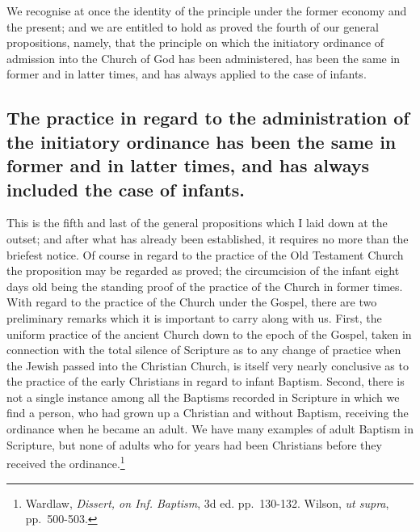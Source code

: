 \documentclass[]{book}
\begin{document}
We recognise at once the identity of the principle under the former economy and the present; and we are entitled to hold as proved the fourth of our general propositions, namely, that the principle on which the initiatory ordinance of admission into the Church of God has been administered, has been the same in former and in latter times, and has always applied to the case of infants.

\hypertarget{the-practice-in-regard-to-the-administration-of-the-initiatory-ordinance-has-been-the-same-in-former-and-in-latter-times-and-has-always-included-the-case-of-infants.}{%
\subsection{The practice in regard to the administration of the initiatory ordinance has been the same in former and in latter times, and has always included the case of infants.}\label{the-practice-in-regard-to-the-administration-of-the-initiatory-ordinance-has-been-the-same-in-former-and-in-latter-times-and-has-always-included-the-case-of-infants.}}

This is the fifth and last of the general propositions which I laid down at the outset; and after what has already been established, it requires no more than the briefest notice. Of course in regard to the practice of the Old Testament Church the proposition may be regarded as proved; the circumcision of the infant eight days old being the standing proof of the practice of the Church in former times. With regard to the practice of the Church under the Gospel, there are two preliminary remarks which it is important to carry along with us. First, the uniform practice of the ancient Church down to the epoch of the Gospel, taken in connection with the total silence of Scripture as to any change of practice when the Jewish passed into the Christian Church, is itself very nearly conclusive as to the practice of the early Christians in regard to infant Baptism. Second, there is not a single instance among all the Baptisms recorded in Scripture in which we find a person, who had grown up a Christian and without Baptism, receiving the ordinance when he became an adult. We have many examples of adult Baptism in Scripture, but none of adults who for years had been Christians before they received the ordinance.\footnote{Wardlaw, \emph{Dissert, on Inf. Baptism}, 3d ed. pp.~130-132. Wilson, \emph{ut supra}, pp.~500-503.}
\end{document}
